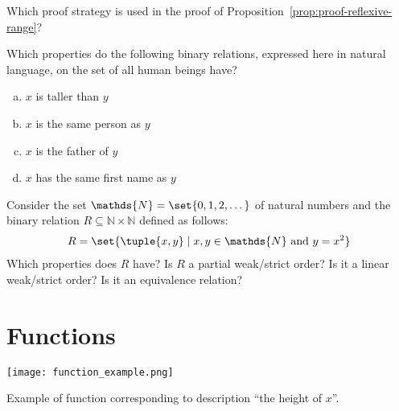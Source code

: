 \documentclass[nobib,nofonts]{tufte-handout}
\begin{document}
\bigskip
\noindent \colorbox{mygray}{\centering
  \begin{minipage}{1.0\textwidth}

    \begin{exercise}
      Which proof strategy is used in the proof of Proposition~\ref{prop:proof-reflexive-range}?
    \end{exercise}

    \begin{exercise}
      Which properties do the following binary relations, expressed here in natural language, on the set of all human beings have?
      \begin{multicols}{2}
      \begin{enumerate}[a.]
        \item $x$ is taller than $y$
        \item $x$ is the same person as $y$
        \item $x$ is the father of $y$
        \item $x$ has the same first name as $y$
      \end{enumerate}
    \end{multicols}
    \end{exercise}

    \begin{exercise}
      Consider the set $\mathds{N} = \set{0, 1, 2, \dots}$ of natural numbers and the binary relation $R \subseteq \mathds{N} \times \mathds{N}$ defined as follows:
      \begin{align*}
        R = \set{\tuple{x,y} \mid x, y \in \mathds{N} \text{ and } y = x^{2}}
      \end{align*}
      Which properties does $R$ have? Is $R$ a partial weak/strict order? Is it a linear weak/strict order? Is it an equivalence relation?
    \end{exercise}

  \end{minipage}
}

\newpage

\section{Functions}

\begin{marginfigure}
  \texttt{[image: function\_example.png]}
  \caption{Example of function corresponding to description ``the height of $x$''.}
  \label{fig:function_ex}
\end{marginfigure}
\end{document}
